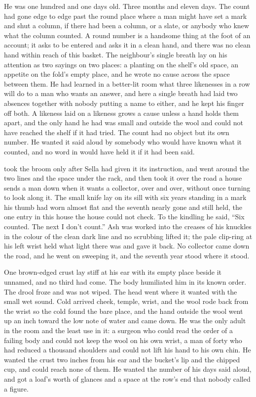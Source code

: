 He was one hundred and one days old. Three months and eleven days. The count had gone edge to edge past the round place where a man might have set a mark and shut a column, if there had been a column, or a slate, or anybody who knew what the column counted. A round number is a handsome thing at the foot of an account; it asks to be entered and asks it in a clean hand, and there was no clean hand within reach of this basket. The neighbour's single breath lay on his attention as two sayings on two places: a planting on the shelf's old space, an appetite on the fold's empty place, and he wrote no cause across the space between them. He had learned in a better-lit room what three likenesses in a row will do to a man who wants an answer, and here a single breath had laid two absences together with nobody putting a name to either, and he kept his finger off both. A likeness laid on a likeness grows a cause unless a hand holds them apart, and the only hand he had was small and outside the wool and could not have reached the shelf if it had tried. The count had no object but its own number. He wanted it said aloud by somebody who would have known what it counted, and no word in  would have held it if it had been said.

 took the broom only after Sella had given it its instruction, and went around the two lines and the space under the rack, and then took it over the road a house sends a man down when it wants a collector, over and over, without once turning to look along it. The small knife lay on its sill with six years standing in a mark his thumb had worn almost flat and the seventh nearly gone and still held, the one entry in this house the house could not check. To the kindling he said, “Six counted. The next I don't count.” Ash was worked into the creases of his knuckles in the colour of the clean dark line and no scrubbing lifted it; the pale clip-ring at his left wrist held what light there was and gave it back. No collector came down the road, and he went on sweeping it, and the seventh year stood where it stood.

One brown-edged crust lay stiff at his ear with its empty place beside it unnamed, and no third had come. The body humiliated him in its known order. The drool froze and was not wiped. The head went where it wanted with the small wet sound. Cold arrived cheek, temple, wrist, and the wool rode back from the wrist so the cold found the bare place, and the hand outside the wool went up an inch toward the low note of water and came down. He was the only adult in the room and the least use in it: a surgeon who could read the order of a failing body and could not keep the wool on his own wrist, a man of forty who had reduced a thousand shoulders and could not lift his hand to his own chin. He wanted the crust two inches from his ear and the bucket's lip and the chipped cup, and could reach none of them. He wanted the number of his days said aloud, and got a loaf's worth of glances and a space at the row's end that nobody called a figure.

